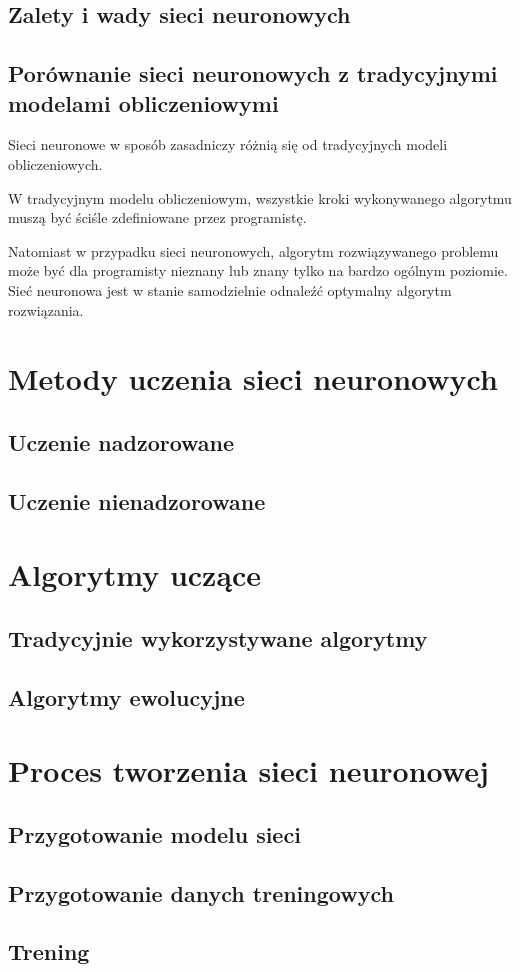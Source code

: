 \subsection{Zalety i wady sieci neuronowych}

\subsection{Porównanie sieci neuronowych z tradycyjnymi modelami obliczeniowymi}
Sieci neuronowe w sposób zasadniczy różnią się od tradycyjnych modeli obliczeniowych.
 
W tradycyjnym modelu obliczeniowym, wszystkie kroki wykonywanego algorytmu muszą być ściśle zdefiniowane przez programistę.

Natomiast w przypadku sieci neuronowych, algorytm rozwiązywanego problemu może być dla programisty nieznany lub znany tylko na bardzo ogólnym poziomie.
Sieć neuronowa jest w stanie samodzielnie odnaleźć optymalny algorytm rozwiązania.

\newpage
\section{Metody uczenia sieci neuronowych}
\subsection{Uczenie nadzorowane}
\subsection{Uczenie nienadzorowane}

\section{Algorytmy uczące}
\subsection{Tradycyjnie wykorzystywane algorytmy}
\subsection{Algorytmy ewolucyjne}

\section{Proces tworzenia sieci neuronowej}
\subsection{Przygotowanie modelu sieci}
\subsection{Przygotowanie danych treningowych}
\subsection{Trening}
